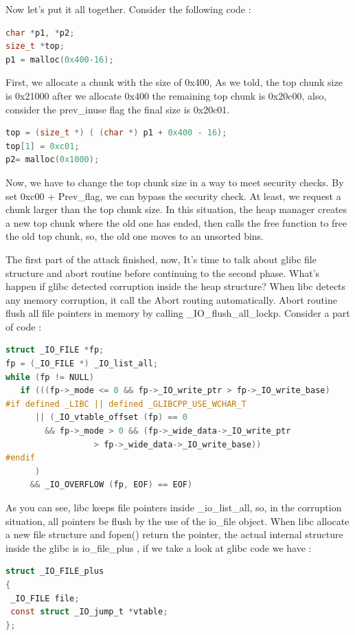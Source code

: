 \documentclass{masterthesis}
\newcommand*\libc{glibc}
\newcommand*\ub{unsorted bins}
\begin{document}
Now let's put it all together. Consider the following code :
\begin{lstlisting}[language=c,frame=tlrb]
char *p1, *p2;
size_t *top;
p1 = malloc(0x400-16);
 \end{lstlisting}
First, we allocate a chunk with the size of 0x400, As we told, the top chunk size is 0x21000 after we allocate 0x400 the remaining top chunk is 0x20c00, also, consider the prev\_inuse flag the final size is 0x20c01.
\begin{lstlisting}[language=c,frame=tlrb]
top = (size_t *) ( (char *) p1 + 0x400 - 16);
top[1] = 0xc01;
p2= malloc(0x1000); 
\end{lstlisting}
Now, we have to change the top chunk size in a way to meet security checks. By set 0xc00 + Prev\_flag, we can bypass the security check. At least, we request a chunk larger than the top chunk size. In this situation, the heap manager creates a new top chunk where the old one has ended, then calls the free function to free the old top chunk, so, the old one moves to an \ub{}. 

The first part of the attack finished, now, It's time to talk about \libc{} file structure and abort routine before continuing to the second phase. What's happen if \libc{} detected corruption inside the heap structure? When libc detects any memory corruption, it call the Abort routing automatically. Abort routine flush all file pointers in memory by calling \_IO\_flush\_all\_lockp. Consider a part of code : 
\begin{lstlisting}[language=c,frame=tlrb]
struct _IO_FILE *fp;
fp = (_IO_FILE *) _IO_list_all;
while (fp != NULL)
   if (((fp->_mode <= 0 && fp->_IO_write_ptr > fp->_IO_write_base)
#if defined _LIBC || defined _GLIBCPP_USE_WCHAR_T
	  || (_IO_vtable_offset (fp) == 0
	    && fp->_mode > 0 && (fp->_wide_data->_IO_write_ptr
				  > fp->_wide_data->_IO_write_base))
#endif
	  )
	 && _IO_OVERFLOW (fp, EOF) == EOF)
\end{lstlisting}
As you can see, libc keeps file pointers inside \_io\_list\_all, so, in the corruption situation, all pointers be flush by the use of the io\_file object. When libc allocate a new file structure and fopen() return the pointer, the actual internal structure inside the \libc{} is io\_file\_plus , if we take a look at \libc{} code we have :
\begin{lstlisting}[language=c,frame=tlrb]
struct _IO_FILE_plus
{
 _IO_FILE file;
 const struct _IO_jump_t *vtable;
};
\end{lstlisting}
\end{document}
